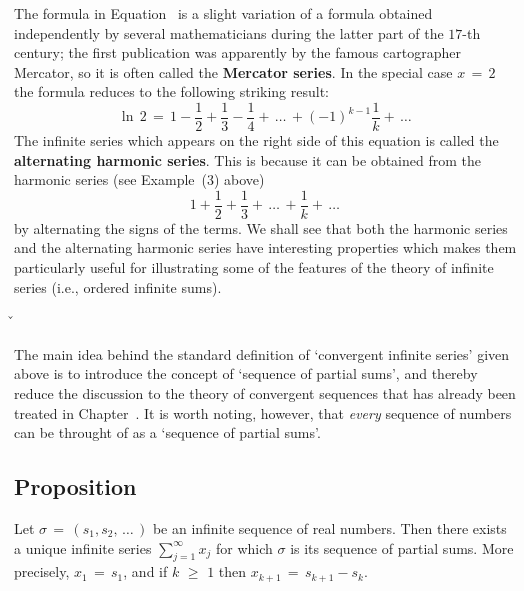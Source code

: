         The formula in Equation~ is a slight variation of a formula obtained independently by several mathematicians during the latter part of the $17$-th century;
    the first publication was apparently by the famous cartographer Mercator, so it is often called the {\bf Mercator series}.
    In the special case $x \,=\, 2$ the formula reduces to the following striking result:
        \begin{equation}
        \label{EqnG.70}
        {\ln}\, 2 \,=\, 1 - \frac{1}{2} + \frac{1}{3} - \frac{1}{4} + \,{\ldots}\,+ (-1)^{k-1}\frac{1}{k} + \,{\ldots}\,
        \end{equation}
    The infinite series which appears on the right side of this equation is called the {\bf alternating harmonic series}.
    This is because it can be obtained from the harmonic series (see Example~(3) above)
        \begin{displaymath}
        1+\frac{1}{2}+\frac{1}{3}+\,{\ldots}\,+\frac{1}{k}+\,{\ldots}\,
        \end{displaymath}
    by alternating the signs of the terms.
    We shall see that both the harmonic series and the alternating harmonic series have interesting properties which makes them particularly useful for illustrating some of the features of the theory of infinite series (i.e., ordered infinite sums).

\v
\V

        The main idea behind the standard definition of `convergent infinite series' given above is to introduce the concept of `sequence of partial sums',
    and thereby reduce the discussion to the theory of convergent sequences that has already been treated in Chapter~.
    It is worth noting, however, that {\em every} sequence of numbers can be throught of as a `sequence of partial sums'.

\V
\V

        \subsection{\small{{\bf Proposition}}}
        \label{PropG30.40}

        Let ${\sigma} \,=\, (s_{1}, s_{2},\,{\ldots}\,)$ be an infinite sequence of real numbers.
    Then there exists a unique infinite series $\sum_{j=1}^{{\infty}} x_{j}$ for which ${\sigma}$ is its sequence of partial sums.
    More precisely, $x_{1} \,=\, s_{1}$, and if $k\,\,{\geq}\,\,1$ then $x_{k+1} \,=\, s_{k+1}-s_{k}$.

